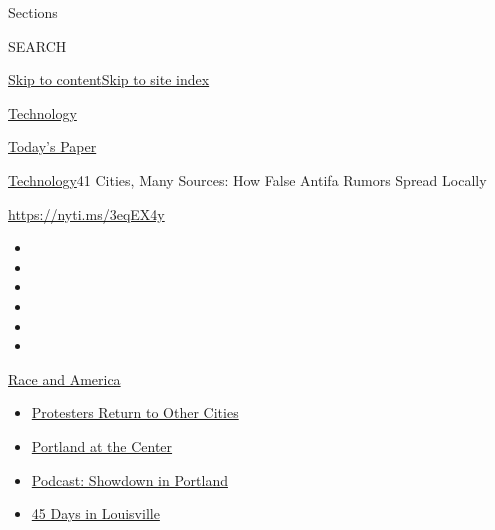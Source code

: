 Sections

SEARCH

\protect\hyperlink{site-content}{Skip to
content}\protect\hyperlink{site-index}{Skip to site index}

\href{https://www.nytimes.com/section/technology}{Technology}

\href{https://myaccount.nytimes.com/auth/login?response_type=cookie\&client_id=vi}{}

\href{https://www.nytimes.com/section/todayspaper}{Today's Paper}

\href{/section/technology}{Technology}\textbar{}41 Cities, Many Sources:
How False Antifa Rumors Spread Locally

\url{https://nyti.ms/3eqEX4y}

\begin{itemize}
\item
\item
\item
\item
\item
\item
\end{itemize}

\href{https://www.nytimes.com/news-event/george-floyd-protests-minneapolis-new-york-los-angeles?action=click\&pgtype=Article\&state=default\&region=TOP_BANNER\&context=storylines_menu}{Race
and America}

\begin{itemize}
\tightlist
\item
  \href{https://www.nytimes.com/2020/07/26/us/protests-portland-seattle-trump.html?action=click\&pgtype=Article\&state=default\&region=TOP_BANNER\&context=storylines_menu}{Protesters
  Return to Other Cities}
\item
  \href{https://www.nytimes.com/2020/07/24/us/portland-oregon-protests-white-race.html?action=click\&pgtype=Article\&state=default\&region=TOP_BANNER\&context=storylines_menu}{Portland
  at the Center}
\item
  \href{https://www.nytimes.com/2020/07/23/podcasts/the-daily/portland-protests.html?action=click\&pgtype=Article\&state=default\&region=TOP_BANNER\&context=storylines_menu}{Podcast:
  Showdown in Portland}
\item
  \href{https://www.nytimes.com/interactive/2020/07/16/us/black-lives-matter-protests-louisville-breonna-taylor.html?action=click\&pgtype=Article\&state=default\&region=TOP_BANNER\&context=storylines_menu}{45
  Days in Louisville}
\end{itemize}

